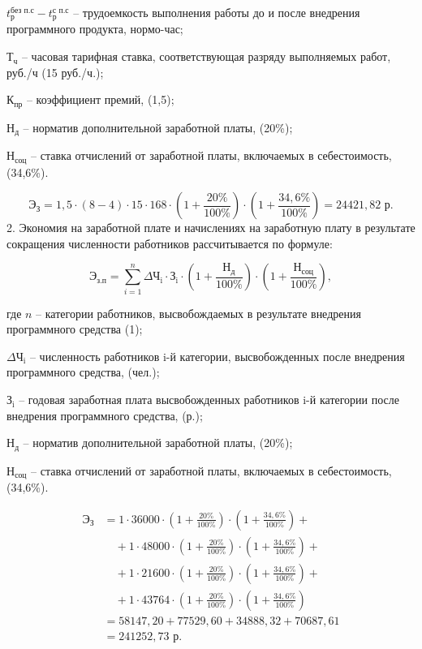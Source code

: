 $t^{\text{без п.с}}_{\text{р}}-t^{\text{с п.с}}_{\text{р}}$ -- трудоемкость выполнения работы до и после внедрения программного продукта, нормо-час;

$\text{Т}_{\text{ч}}$ -- часовая тарифная ставка, соответствующая разряду выполняемых работ, руб./ч (15 руб./ч.);

$\text{К}_{\text{пр}}$ -- коэффициент премий, (1,5);

$\text{Н}_{\text{д}}$ -- норматив дополнительной заработной платы, (20\%);

$\text{Н}_{\text{соц}}$ -- ставка отчислений от заработной платы, включаемых в себестоимость, (34,6\%).

$$
	\text{Э}_{\text{З}} = 1,5 \cdot (8-4)\cdot 15\cdot 168 \cdot  (1+\frac{20\%}{100\%})\cdot (1+\frac{34,6\%}{100\%}) =  24421,82 \text{ р}.

$$
2. Экономия на заработной плате и начислениях на заработную плату в результате сокращения численности работников рассчитывается по формуле:

\begin{equation}
	\text{Э}_{\text{з.п}} = \sum_{i=1}^{n}{\text{$\Delta$Ч}_{\text{i}}\cdot \text{З}_{\text{i}}\cdot  (1+\frac{\text{Н}_{\text{д}}}{100\%})\cdot (1+\frac{\text{Н}_{\text{соц}}}{100\%})},

\end{equation}

где $n$ -- категории работников, высвобождаемых в результате внедрения
программного средства (1);

$\text{$\Delta$Ч}_{\text{i}}$ -- численность работников i-й категории, высвобожденных после
внедрения программного средства, (чел.);

$\text{З}_{\text{i}}$ -- годовая заработная плата высвобожденных работников i-й категории после внедрения программного средства, (р.);

$\text{Н}_{\text{д}}$ -- норматив дополнительной заработной платы, (20\%);

$\text{Н}_{\text{соц}}$ -- ставка отчислений от заработной платы, включаемых в себестоимость, (34,6\%).

\begin{align*}
	\text{Э}_{\text{З}} & = 1 \cdot 36000 \cdot \left(1 + \frac{20\%}{100\%}\right) \cdot \left(1 + \frac{34,6\%}{100\%}\right) +       \\
	                    & \quad + 1 \cdot 48000 \cdot \left(1 + \frac{20\%}{100\%}\right) \cdot \left(1 + \frac{34,6\%}{100\%}\right) + \\
	                    & \quad + 1 \cdot 21600 \cdot \left(1 + \frac{20\%}{100\%}\right) \cdot \left(1 + \frac{34,6\%}{100\%}\right) + \\
	                    & \quad + 1 \cdot 43764 \cdot \left(1 + \frac{20\%}{100\%}\right) \cdot \left(1 + \frac{34,6\%}{100\%}\right)   \\
	                    & = 58147,20 + 77529,60 + 34888,32 + 70687,61                                                                   \\
	                    & = 241252,73 \text{ р}.

\end{align*}

